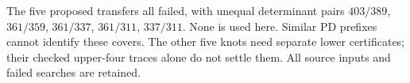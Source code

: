 \documentclass[11pt]{article}
\begin{document}
The five proposed transfers all failed, with unequal determinant pairs
$403/389$, $361/359$, $361/337$, $361/311$, $337/311$.
None is used here. Similar PD prefixes cannot identify these covers.
The other five knots need separate lower certificates; their checked
upper-four traces alone do not settle them. All source inputs and failed
searches are retained.
\end{document}
